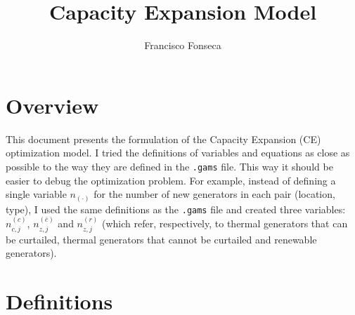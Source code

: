 \documentclass[11pt, oneside]{article}   	%
\title{Capacity Expansion Model}
\author{Francisco Fonseca}
\newcommand{\bc}{\bar{c}}
\begin{document}
\maketitle

\tableofcontents

\newpage

\section{Overview}

This document presents the formulation of the Capacity Expansion (CE) optimization model. I tried the definitions of variables and equations as close as possible to the way they are defined in the \texttt{.gams} file. This way it should be easier to debug the optimization problem. For example, instead of defining a single variable $n_{(\cdot)}$ for the number of new generators in each pair (location, type), I used the same definitions as the \texttt{.gams} file and created three variables: $n^{(c)}_{c, j}$, $n^{(\bc)}_{z, j}$ and $n^{(r)}_{z, j}$ (which refer, respectively, to thermal generators that can be curtailed, thermal generators that cannot be curtailed and renewable generators).

\section{Definitions}
\end{document}
